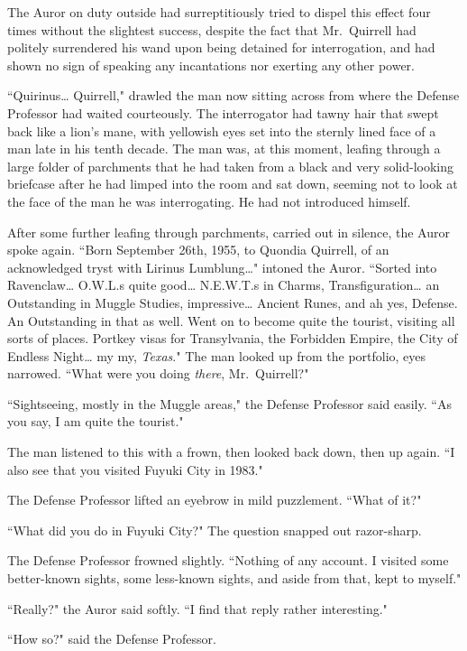 The Auror on duty outside had surreptitiously tried to dispel this effect four times without the slightest success, despite the fact that Mr.~Quirrell had politely surrendered his wand upon being detained for interrogation, and had shown no sign of speaking any incantations nor exerting any other power.

``Quirinus{\ldots} Quirrell," drawled the man now sitting across from where the Defense Professor had waited courteously. The interrogator had tawny hair that swept back like a lion's mane, with yellowish eyes set into the sternly lined face of a man late in his tenth decade. The man was, at this moment, leafing through a large folder of parchments that he had taken from a black and very solid-looking briefcase after he had limped into the room and sat down, seeming not to look at the face of the man he was interrogating. He had not introduced himself.

After some further leafing through parchments, carried out in silence, the Auror spoke again. ``Born September 26th, 1955, to Quondia Quirrell, of an acknowledged tryst with Lirinus Lumblung{\ldots}" intoned the Auror. ``Sorted into Ravenclaw{\ldots} O.W.L.s quite good{\ldots} N.E.W.T.s in Charms, Transfiguration{\ldots} an Outstanding in Muggle Studies, impressive{\ldots} Ancient Runes, and ah yes, Defense. An Outstanding in that as well. Went on to become quite the tourist, visiting all sorts of places. Portkey visas for Transylvania, the Forbidden Empire, the City of Endless Night{\ldots} my my, \emph{Texas}." The man looked up from the portfolio, eyes narrowed. ``What were you doing \emph{there}, Mr.~Quirrell?"

``Sightseeing, mostly in the Muggle areas," the Defense Professor said easily. ``As you say, I am quite the tourist."

The man listened to this with a frown, then looked back down, then up again. ``I also see that you visited Fuyuki City in 1983."

The Defense Professor lifted an eyebrow in mild puzzlement. ``What of it?"

``What did you do in Fuyuki City?" The question snapped out razor-sharp.

The Defense Professor frowned slightly. ``Nothing of any account. I visited some better-known sights, some less-known sights, and aside from that, kept to myself."

``Really?" the Auror said softly. ``I find that reply rather interesting."

``How so?" said the Defense Professor.

